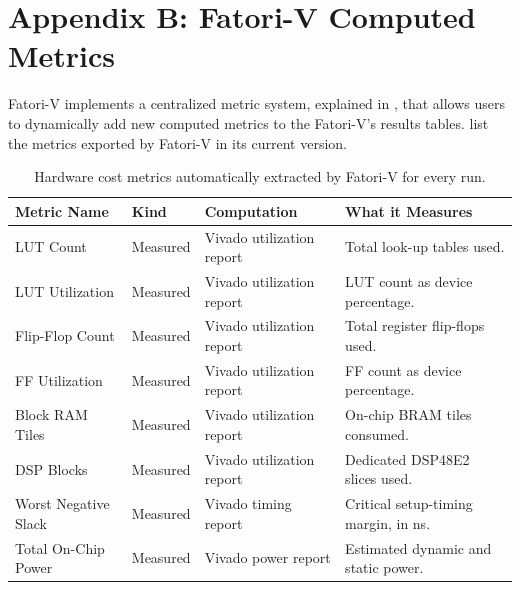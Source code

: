 \chapter{Appendix B: Fatori-V Computed Metrics}
\label{app_b:metrics}

\ac{Fatori-V} implements a centralized metric system, explained in , that allows users to dynamically add new computed metrics to the \ac{Fatori-V}'s results tables.  list the metrics exported by \ac{Fatori-V} in its current version.

\begin{table}[h]
\centering
\small
\setlength{\tabcolsep}{3.2pt}
\renewcommand{\arraystretch}{1.25}
\begin{tabularx}{\textwidth}{|p{}|p{}|X|X|}
\hline
Metric Name &
Kind &
Computation &
What it Measures \\
\hline
\hline
LUT Count &
Measured &
Vivado utilization report &
Total look-up tables used. \\
\hline
LUT Utilization &
Measured &
Vivado utilization report &
LUT count as device percentage. \\
\hline
Flip-Flop Count &
Measured &
Vivado utilization report &
Total register flip-flops used. \\
\hline
FF Utilization &
Measured &
Vivado utilization report &
FF count as device percentage. \\
\hline
Block RAM Tiles &
Measured &
Vivado utilization report &
On-chip BRAM tiles consumed. \\
\hline
DSP Blocks &
Measured &
Vivado utilization report &
Dedicated DSP48E2 slices used. \\
\hline
Worst Negative Slack &
Measured &
Vivado timing report &
Critical setup-timing margin, in ns. \\
\hline
Total On-Chip Power &
Measured &
Vivado power report &
Estimated dynamic and static power. \\
\hline
\end{tabularx}
\caption{Hardware cost metrics automatically extracted by \ac{Fatori-V} for every run.}
\label{tab:metrics_hardware}
\end{table}




